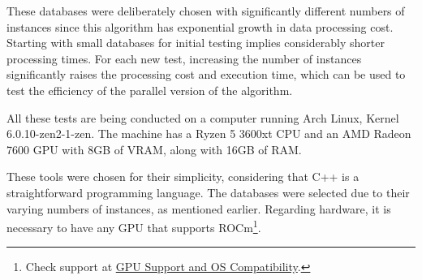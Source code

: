 These databases were deliberately chosen with significantly different numbers of instances since this algorithm has exponential growth in data processing cost. Starting with small databases for initial testing implies considerably shorter processing times. For each new test, increasing the number of instances significantly raises the processing cost and execution time, which can be used to test the efficiency of the parallel version of the algorithm.

All these tests are being conducted on a computer running Arch Linux, Kernel 6.0.10-zen2-1-zen. The machine has a Ryzen 5 3600xt CPU and an AMD Radeon 7600 GPU with 8GB of VRAM, along with 16GB of RAM.

These tools were chosen for their simplicity, considering that C++ is a straightforward programming language. The databases were selected due to their varying numbers of instances, as mentioned earlier. Regarding hardware, it is necessary to have any GPU that supports ROCm\footnote[2]{Check support at \href{https://rocm.docs.amd.com/en/latest/release/gpu_os_support.html}{GPU Support and OS Compatibility}.}.
